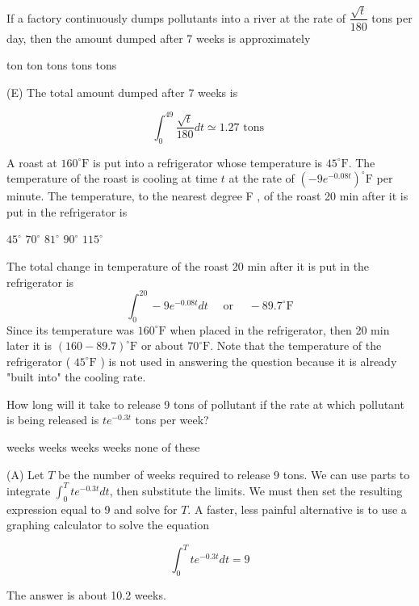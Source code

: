 \question
If a factory continuously dumps pollutants into a river at the rate of $\dfrac{\sqrt{t}}{180}$ tons per day, then the amount dumped after 7 weeks is approximately
\begin{choices}
   ton
   ton
   tons
   tons
   tons
\end{choices}
\begin{solution}
(E) The total amount dumped after 7 weeks is

\[
\int_{0}^{49} \dfrac{\sqrt{t}}{180} d t \simeq 1.27 \text { tons }
\]


\end{solution}

\question
A roast at $160^{\circ} \mathrm{F}$ is put into a refrigerator whose temperature is $45^{\circ} \mathrm{F}$. The temperature of the roast is cooling at time $t$ at the rate of $\left(-9 e^{-0.08 t}\right)^{\circ} \mathrm{F}$ per minute. The temperature, to the nearest degree F , of the roast 20 min after it is put in the refrigerator is
\begin{choices}
  \choice $45^{\circ}$
  \CorrectChoice $70^{\circ}$
  \choice $81^{\circ}$
  \choice $90^{\circ}$
  \choice $115^{\circ}$
\end{choices}
\begin{solution}
The total change in temperature of the roast 20 min after it is put in the refrigerator is
\[
\int_{0}^{20}-9 e^{-0.08 t} d t \quad \text { or } \quad-89.7^{\circ} \mathrm{F}
\]
Since its temperature was $160^{\circ} \mathrm{F}$ when placed in the refrigerator, then 20 min later it is $(160-89.7)^{\circ} \mathrm{F}$ or about $70^{\circ} \mathrm{F}$. Note that the temperature of the refrigerator ( $45^{\circ} \mathrm{F}$ ) is not used in answering the question because it is already "built into" the cooling rate.
\end{solution}





\newpage




\question
How long will it take to release 9 tons of pollutant if the rate at which pollutant is being released is $t e^{-0.3 t}$ tons per week?
\begin{choices}
   weeks
   weeks
   weeks
   weeks
  \choice none of these
\end{choices}
\begin{solution}
(A) Let $T$ be the number of weeks required to release 9 tons. We can use parts to integrate $\int_{0}^{T} t e^{-0.3 t} d t$, then substitute the limits. We must then set the resulting expression equal to 9 and solve for $T$. A faster, less painful alternative is to use a graphing calculator to solve the equation

\[
\int_{0}^{T} t e^{-0.3 t} d t=9
\]

The answer is about 10.2 weeks.
\end{solution}

